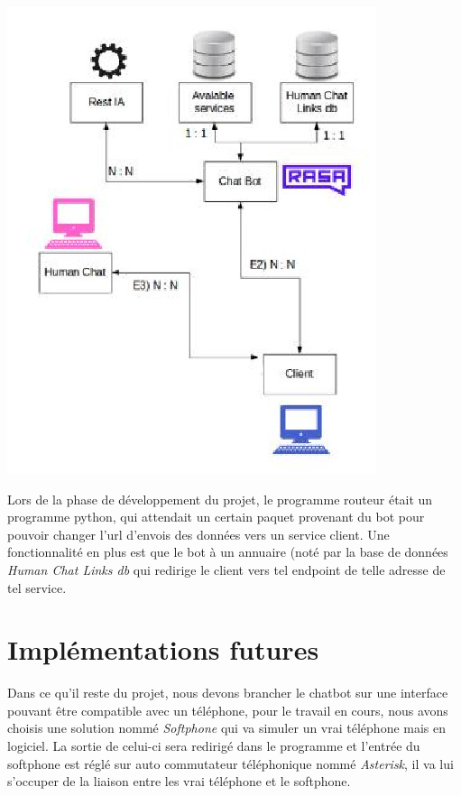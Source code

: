 \begin{center}
\includegraphics[scale=0.9]{img/plans.jpg}
\end{center}

Lors de la phase de développement du projet, le programme routeur était un programme python, qui attendait un certain paquet provenant du bot pour pouvoir changer l'url d’envois des données vers un service client. Une fonctionnalité en plus est que le bot à un annuaire (noté par la base de données \textit{Human Chat Links db} qui redirige le client vers tel endpoint de telle adresse de tel service.\linebreak

\section{Implémentations futures}

Dans ce qu'il reste du projet, nous devons brancher le chatbot sur une interface pouvant être compatible avec un téléphone, pour le travail en cours, nous avons choisis une solution nommé \textit{Softphone} qui va simuler un vrai téléphone mais en logiciel. La sortie de celui-ci sera redirigé dans le programme et l'entrée du softphone est réglé sur auto commutateur téléphonique nommé \textit{Asterisk}, il va lui s'occuper de la liaison entre les vrai téléphone et le softphone.

